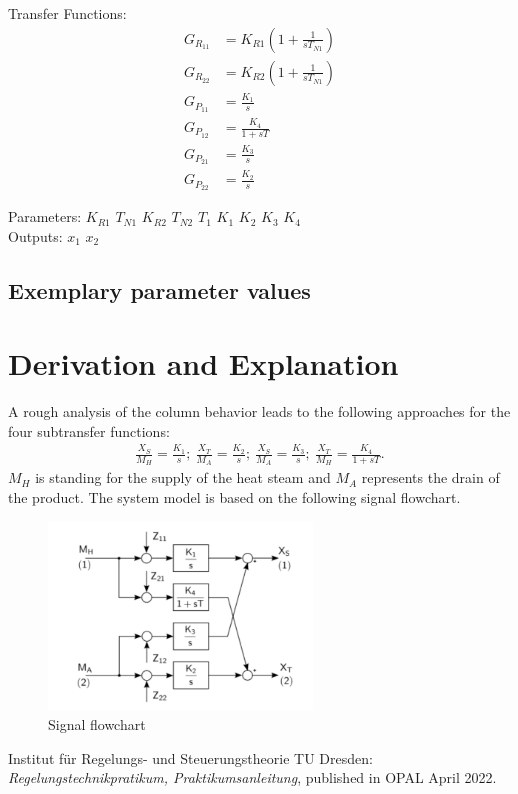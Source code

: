 \documentclass[10pt,a4paper]{article}
\begin{document}
	\noindent Transfer Functions:			
	\begin{subequations}
	\begin{align}
		G_{R_{11}} &= K_{R1}\left(1 + \frac{1}{sT_{N1}}\right) \\ 
		G_{R_{22}} &= K_{R2}\left(1 + \frac{1}{sT_{N1}}\right) \\
		G_{P_{11}} &= \frac{K_1}{s} \\
		G_{P_{12}} &= \frac{K_4}{1 + sT} \\
		G_{P_{21}} &= \frac{K_3}{s} \\
		G_{P_{22}} &= \frac{K_2}{s} 				
	\end{align}
	\end{subequations}

	\noindent
	Parameters: $K_{R1}$ $T_{N1}$ $K_{R2}$ $T_{N2}$ $T_1$ $K_1$ $K_2$ $K_3$ $K_4$ %
	\\
	Outputs: $x_1$ $x_2$ \\%
	

	
	\subsection{Exemplary parameter values}
	

	
	\section{Derivation and Explanation} %
	A rough analysis of the column behavior leads to the following approaches for the four subtransfer functions:
	\begin{align*}
		\frac{X_S}{M_H} = \frac{K_1}{s};\ \frac{X_T}{M_A} = \frac{K_2}{s};\ \frac{X_S}{M_A} = \frac{K_3}{s};\ \frac{X_T}{M_H} = \frac{K_4}{1 + sT}.
	\end{align*}
	$M_H$ is standing for the supply of the heat steam and $M_A$ represents the drain of the product. The system model is based on the following signal flowchart.
	\begin{figure}[H]
		\centering
		\includegraphics[width=70mm]{flowchart.pdf}
		\caption{Signal flowchart}
	\end{figure}
	
	\begin{thebibliography}{10}		
		Institut für Regelungs- und Steuerungstheorie TU Dresden: \textit{Regelungstechnikpratikum, Praktikumsanleitung}, published in OPAL April 2022. 
	\end{thebibliography}
\end{document}
